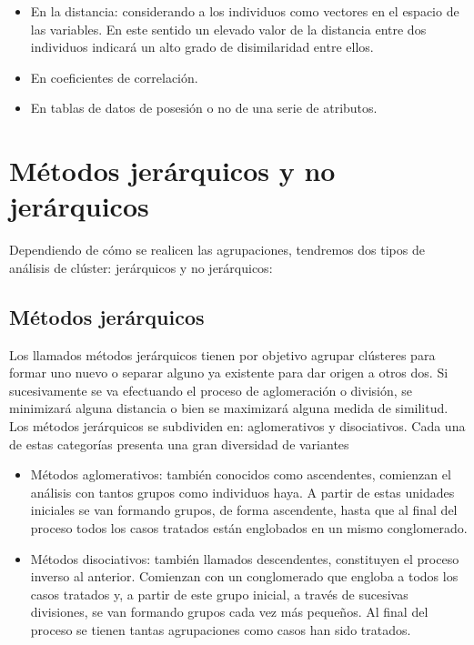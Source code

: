 \documentclass[12pt,]{krantz}
\begin{document}
\begin{itemize}
\item
  En la distancia: considerando a los individuos como vectores en el espacio de las variables. En este sentido un elevado valor de la distancia entre dos individuos indicará un alto grado de disimilaridad entre ellos.
\item
  En coeficientes de correlación.
\item
  En tablas de datos de posesión o no de una serie de atributos.
\end{itemize}

\hypertarget{metodos-jerarquicos-y-no-jerarquicos}{%
\section{Métodos jerárquicos y no jerárquicos}\label{metodos-jerarquicos-y-no-jerarquicos}}

Dependiendo de cómo se realicen las agrupaciones, tendremos dos tipos de análisis de clúster: jerárquicos y no jerárquicos:

\hypertarget{metodos-jerarquicos}{%
\subsection{Métodos jerárquicos}\label{metodos-jerarquicos}}

Los llamados métodos jerárquicos tienen por objetivo agrupar clústeres para formar uno nuevo o separar alguno ya existente para dar origen a otros dos. Si sucesivamente se va efectuando el proceso de aglomeración o división, se minimizará alguna distancia o bien se maximizará alguna medida de similitud. Los métodos jerárquicos se subdividen en: aglomerativos y disociativos. Cada una de estas categorías presenta una gran diversidad de variantes

\begin{itemize}
\item
  Métodos aglomerativos: también conocidos como ascendentes, comienzan el análisis con tantos grupos como individuos haya. A partir de estas unidades iniciales se van formando grupos, de forma ascendente, hasta que al final del proceso todos los casos tratados están englobados en un mismo conglomerado.
\item
  Métodos disociativos: también llamados descendentes, constituyen el proceso inverso al anterior. Comienzan con un conglomerado que engloba a todos los casos tratados y, a partir de este grupo inicial, a través de sucesivas divisiones, se van formando grupos cada vez más pequeños. Al final del proceso se tienen tantas agrupaciones como casos han sido tratados.
\end{itemize}
\end{document}
